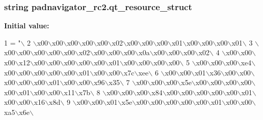 \subsubsection[{qt\+\_\+resource\+\_\+struct}]{\setlength{\rightskip}{0pt plus 5cm}string padnavigator\+\_\+rc2.\+qt\+\_\+resource\+\_\+struct}\label{namespacepadnavigator__rc2_a33e1b06b072dfaeb867b6227eeb325df}
{\bfseries Initial value\+:}
\begin{DoxyCode}
1 = \textcolor{stringliteral}{"\(\backslash\)}
2 \textcolor{stringliteral}{\(\backslash\)x00\(\backslash\)x00\(\backslash\)x00\(\backslash\)x00\(\backslash\)x00\(\backslash\)x02\(\backslash\)x00\(\backslash\)x00\(\backslash\)x00\(\backslash\)x01\(\backslash\)x00\(\backslash\)x00\(\backslash\)x00\(\backslash\)x01\(\backslash\)}
3 \textcolor{stringliteral}{\(\backslash\)x00\(\backslash\)x00\(\backslash\)x00\(\backslash\)x00\(\backslash\)x00\(\backslash\)x02\(\backslash\)x00\(\backslash\)x00\(\backslash\)x00\(\backslash\)x0a\(\backslash\)x00\(\backslash\)x00\(\backslash\)x00\(\backslash\)x02\(\backslash\)}
4 \textcolor{stringliteral}{\(\backslash\)x00\(\backslash\)x00\(\backslash\)x00\(\backslash\)x12\(\backslash\)x00\(\backslash\)x00\(\backslash\)x00\(\backslash\)x00\(\backslash\)x00\(\backslash\)x01\(\backslash\)x00\(\backslash\)x00\(\backslash\)x00\(\backslash\)x00\(\backslash\)}
5 \textcolor{stringliteral}{\(\backslash\)x00\(\backslash\)x00\(\backslash\)x00\(\backslash\)xe4\(\backslash\)x00\(\backslash\)x00\(\backslash\)x00\(\backslash\)x00\(\backslash\)x00\(\backslash\)x01\(\backslash\)x00\(\backslash\)x00\(\backslash\)x7c\(\backslash\)xee\(\backslash\)}
6 \textcolor{stringliteral}{\(\backslash\)x00\(\backslash\)x00\(\backslash\)x01\(\backslash\)x36\(\backslash\)x00\(\backslash\)x00\(\backslash\)x00\(\backslash\)x00\(\backslash\)x00\(\backslash\)x01\(\backslash\)x00\(\backslash\)x00\(\backslash\)x96\(\backslash\)x35\(\backslash\)}
7 \textcolor{stringliteral}{\(\backslash\)x00\(\backslash\)x00\(\backslash\)x00\(\backslash\)x5e\(\backslash\)x00\(\backslash\)x00\(\backslash\)x00\(\backslash\)x00\(\backslash\)x00\(\backslash\)x01\(\backslash\)x00\(\backslash\)x00\(\backslash\)x11\(\backslash\)x7b\(\backslash\)}
8 \textcolor{stringliteral}{\(\backslash\)x00\(\backslash\)x00\(\backslash\)x00\(\backslash\)x84\(\backslash\)x00\(\backslash\)x00\(\backslash\)x00\(\backslash\)x00\(\backslash\)x00\(\backslash\)x01\(\backslash\)x00\(\backslash\)x00\(\backslash\)x16\(\backslash\)x8d\(\backslash\)}
9 \textcolor{stringliteral}{\(\backslash\)x00\(\backslash\)x00\(\backslash\)x01\(\backslash\)x5e\(\backslash\)x00\(\backslash\)x00\(\backslash\)x00\(\backslash\)x00\(\backslash\)x00\(\backslash\)x01\(\backslash\)x00\(\backslash\)x00\(\backslash\)xa5\(\backslash\)x6e\(\backslash\)}

\end{DoxyCode}
